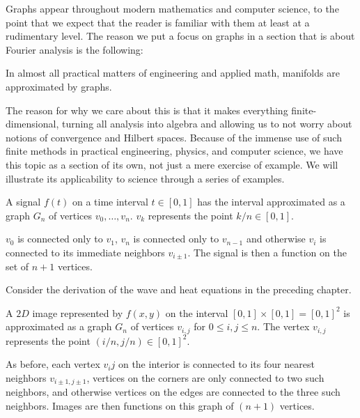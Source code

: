 \documentclass[../master.tex]{subfiles}
\begin{document}
	Graphs appear throughout modern mathematics and computer science, to the point that we expect that the reader is familiar with them at least at a rudimentary level. The reason we put a focus on graphs in a section that is about Fourier analysis is the following:
	\begin{concept}
		In almost all practical matters of engineering and applied math, manifolds are approximated by graphs. 
	\end{concept}
	The reason for why we care about this is that it makes everything finite-dimensional, turning all analysis into algebra and allowing us to not worry about notions of convergence and Hilbert spaces. Because of the immense use of such finite methods in practical engineering, physics, and computer science, we have this topic as a section of its own, not just a mere exercise of example. We will illustrate its applicability to science through a series of examples.
	\begin{example}
		A signal $f(t)$ on a time interval $t \in [0,1]$ has the interval approximated as a graph $G_n$ of vertices $v_0, \dots, v_n$. $v_k$ represents the point $k/n \in [0,1]$. 
		
		$v_0$ is connected only to $v_1$, $v_n$ is connected only to $v_{n-1}$ and otherwise $v_{i}$ is connected to its immediate neighbors $v_{i\pm1}$. The signal is then a function on the set of $n+1$ vertices. 
	\end{example}
	Consider the derivation of the wave and heat equations in the preceding chapter. 
	\begin{example}
		A $2D$ image represented by $f(x,y)$ on the interval $[0,1] \times [0,1] = [0,1]^2$ is approximated as a graph $G_n$ of vertices $v_{i,j}$ for $0\leq i, j \leq n$. The vertex $v_{i,j}$ represents the point $(i/n, j/n) \in [0,1]^2$. 
		
		As before, each vertex $v_ij$ on the interior is connected to its four nearest neighbors $v_{i\pm 1, j\pm1}$, vertices on the corners are only connected to two such neighbors, and otherwise vertices on the edges are connected to the three such neighbors. Images are then functions on this graph of $(n+1)$ vertices. 
	\end{example}
	
\end{document}
